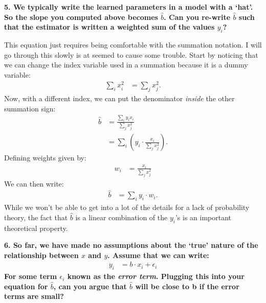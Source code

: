 \documentclass[12pt,hidelinks]{article}
\numberwithin{equation}{section}
\begin{document}
\vspace*{12pt}

\textbf{5. We typically write the learned parameters in a model with a `hat'. So
the slope you computed above becomes $\widehat{b}$. Can you re-write $\widehat{b}$
such that the estimator is written a weighted sum of the values $y_i$?}

\vspace*{12pt}

This equation just requires being comfortable with the summation notation.
I will go through this slowly is at seemed to cause some trouble. Start by
noticing that we can change the index variable used in a summation because
it is a dummy variable:
\begin{align*}
\sum_i x_i^2 &= \sum_j x_j^2.
\end{align*}
Now, with a different index, we can put the denominator \textit{inside} the
other summation sign:
\begin{align*}
\widehat{b} &= \frac{\sum_i y_i x_i}{\sum_j x_j^2} \\
&= \sum_i \left( y_i \cdot \frac{x_i}{\sum_j x_j^2} \right).
\end{align*}
Defining weights given by:
\begin{align*}
w_i &= \frac{x_i}{\sum_j x_j^2}
\end{align*}
We can then write:
\begin{align*}
\widehat{b} &= \sum_i y_i \cdot w_i.
\end{align*}
While we won't be able to get into a lot of the details for a lack of probability
theory, the fact that $\widehat{b}$ is a linear combination of the $y_i$'s is
an important theoretical property.

\vspace*{12pt}

\textbf{6. So far, we have made no assumptions about the `true' nature of the
relationship between $x$ and $y$. Assume that we can write:}
\begin{align}
y_i &= b \cdot x_i + \epsilon_i
\end{align}
\textbf{For some term $\epsilon_i$ known as the \textit{error term}. Plugging
this into your equation for $\widehat{b}$, can you argue that $\widehat{b}$
will be close to b if the error terms are small?}

\vspace*{12pt}
\end{document}

